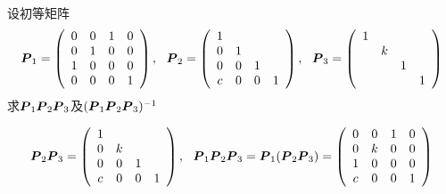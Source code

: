 \begin{li} 
  设初等矩阵
  $$
  \begin{aligned}
  \boldsymbol{P}_1 = \left(
    \begin{array}{cccc}
      0&0&1&0 \\
      0&1&0&0 \\
      1&0&0&0 \\
      0&0&0&1
    \end{array}
  \right), ~~
  \boldsymbol{P}_2 = \left(
    \begin{array}{cccc}
      1& & &  \\
      0&1& &  \\
      0&0&1& \\
      c&0&0&1
    \end{array}
  \right), ~~
  \boldsymbol{P}_3 = \left(
    \begin{array}{cccc}
      1& & &  \\
       &k& &  \\
       & &1& \\
       & & &1
    \end{array}
  \right)
  \end{aligned}
  $$
  求$\boldsymbol{P}_1\boldsymbol{P}_2\boldsymbol{P}_3$及$(\boldsymbol{P}_1\boldsymbol{P}_2\boldsymbol{P}_3)^{-1}$
\end{li}






\begin{jie}
$$
\begin{aligned}
\boldsymbol{P}_2\boldsymbol{P}_3 =    \left(
\begin{array}{cccc}
1& & &  \\
0&k& &  \\
0&0&1& \\
c&0&0&1
\end{array}
\right), ~~
\boldsymbol{P}_1\boldsymbol{P}_2\boldsymbol{P}_3=\boldsymbol{P}_1(\boldsymbol{P}_2\boldsymbol{P}_3) =\left(
\begin{array}{cccc}
0&0&1&0 \\
0&k&0&0  \\
1&0&0&0  \\
c&0&0&1
\end{array}
\right)
\end{aligned}
$$
\end{jie}






